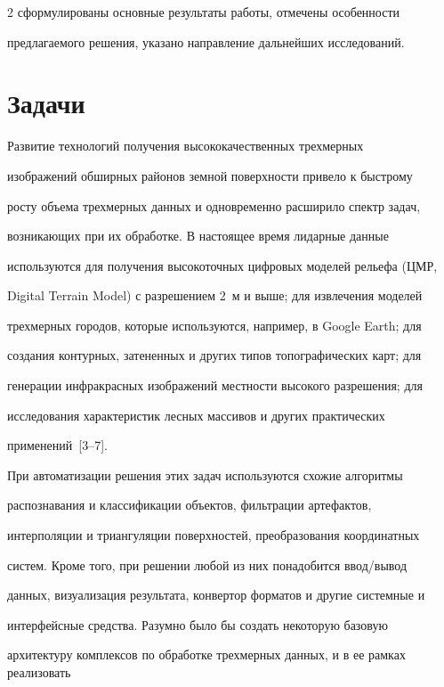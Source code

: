 \begin{multicols}{2}
сформулированы основные результаты работы, отмечены особенности 

предлагаемого решения, указано направление дальнейших исследований.





\section{Задачи}





   Развитие технологий получения высококачественных трехмерных 

изображений обширных районов земной поверхности привело к быстрому 

рос\-ту объема трехмерных данных и одновременно расширило спектр задач, 

возникающих при их обработке. В настоящее время лидарные данные 

используются для получения высокоточных цифровых моделей рель\-ефа (ЦМР, 

Digital Terrain Model) с разрешением 2~м и выше; для извлечения моделей 

трехмерных городов, которые используются, например, в Google Earth; для 

создания контурных, затененных и других типов топографических карт; для 

генерации инфракрасных изображений местности высокого разрешения; для 

исследования характеристик лесных массивов и других практических 

применений~[3--7].

   

   При автоматизации решения этих задач используются схожие алгоритмы 

распознавания и клас\-сификации объектов, фильтрации артефактов, 

интерполяции и триангуляции поверхностей, преобразования координатных 

систем. Кроме того, при решении любой из них понадобится ввод/вывод 

данных, визуализация результата, конвертор форматов и другие системные и 

интерфейсные средства. Разумно было бы создать некоторую базовую 

архитектуру комплексов по обработке трехмерных данных, и в ее рамках реализовать 


\end{multicols}
